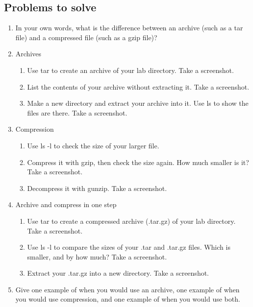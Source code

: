 \documentclass[12pt]{article}
\begin{document}
\subsection*{Problems to solve}
    \begin{enumerate}
        \item In your own words, what is the difference between an archive (such as a tar file) and a compressed file (such as a gzip file)?
        \item Archives
        \begin{enumerate}
            \item Use tar to create an archive of your lab directory. Take a screenshot.
            \item List the contents of your archive without extracting it. Take a screenshot.
            \item Make a new directory and extract your archive into it. Use ls to show the files are there. Take a screenshot.
        \end{enumerate}
        \item Compression
        \begin{enumerate}
            \item Use ls -l to check the size of your larger file.
            \item Compress it with gzip, then check the size again. How much smaller is it? Take a screenshot.
            \item Decompress it with gunzip. Take a screenshot.
        \end{enumerate}
        \item Archive and compress in one step
        \begin{enumerate}
            \item Use tar to create a compressed archive (.tar.gz) of your lab directory. Take a screenshot.
            \item Use ls -l to compare the sizes of your .tar and .tar.gz files. Which is smaller, and by how much? Take a screenshot.
            \item Extract your .tar.gz into a new directory. Take a screenshot.
        \end{enumerate}
        \item Give one example of when you would use an archive, one example of when you would use compression, and one example of when you would use both.
    \end{enumerate}
\end{document}
